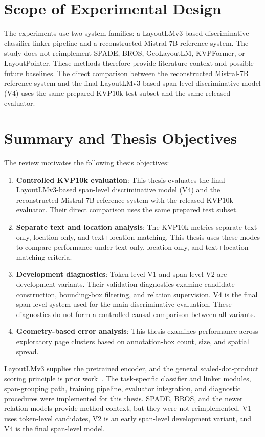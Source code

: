 \section{Scope of Experimental Design}
\label{sec:experimental_scope}

The experiments use two system families: a LayoutLMv3-based discriminative
classifier-linker pipeline and a reconstructed Mistral-7B reference system. The
study does not reimplement SPADE, BROS, GeoLayoutLM, KVPFormer, or
LayoutPointer. These methods therefore provide literature context and possible
future baselines. The direct comparison between the reconstructed Mistral-7B
reference system and the final LayoutLMv3-based span-level discriminative model
(V4) uses the same prepared KVP10k test subset and the same released evaluator.

\section{Summary and Thesis Objectives}
\label{sec:lit_summary}

The review motivates the following thesis objectives:

\begin{enumerate}
    \item \textbf{Controlled KVP10k evaluation}: This thesis evaluates the
    final LayoutLMv3-based span-level discriminative model (V4) and the
    reconstructed Mistral-7B reference system with the released KVP10k
    evaluator. Their direct comparison uses the same prepared test subset.

    \item \textbf{Separate text and location analysis}: The KVP10k metrics
    separate text-only, location-only, and text+location matching. This thesis
    uses these modes to compare performance under text-only, location-only, and
    text+location matching criteria.

    \item \textbf{Development diagnostics}: Token-level V1 and span-level V2
    are development variants. Their validation diagnostics examine candidate
    construction, bounding-box filtering, and relation supervision. V4 is the
    final span-level system used for the main discriminative evaluation. These
    diagnostics do not form a controlled causal comparison between all
    variants.

    \item \textbf{Geometry-based error analysis}: This thesis examines
    performance across exploratory page clusters based on annotation-box
    count, size, and spatial spread.
\end{enumerate}

LayoutLMv3 supplies the pretrained encoder, and the general scaled-dot-product
scoring principle is prior work~\cite{layoutlmv3,vaswani2017attention}. The
task-specific classifier and linker modules, span-grouping path, training
pipeline, evaluator integration, and diagnostic procedures were implemented
for this thesis. SPADE, BROS, and the newer relation models provide method
context, but they were not reimplemented. V1 uses token-level candidates, V2
is an early span-level development variant, and V4 is the final span-level
model.
